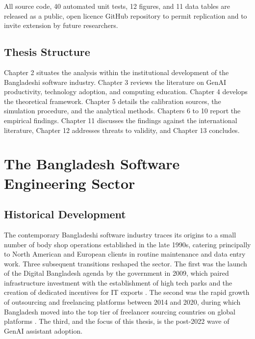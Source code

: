 \documentclass[11pt,a4paper]{report}
\begin{document}
All source code, 40 automated unit tests, 12 figures, and 11 data tables
are released as a public, open licence GitHub repository to permit
replication and to invite extension by future researchers.

\section{Thesis Structure}

\begin{sloppypar}
Chapter 2 situates the analysis within the institutional development of
the Bangladeshi software industry. Chapter 3 reviews the literature on
GenAI productivity, technology adoption, and computing education.
Chapter 4 develops the theoretical framework. Chapter 5 details the
calibration sources, the simulation procedure, and the analytical
methods. Chapters 6 to 10 report the empirical findings. Chapter 11
discusses the findings against the international literature, Chapter 12
addresses threats to validity, and Chapter 13 concludes.
\end{sloppypar}

\chapter{The Bangladesh Software Engineering Sector}

\section{Historical Development}

The contemporary Bangladeshi software industry traces its origins to a
small number of body shop operations established in the late 1990s,
catering principally to North American and European clients in routine
maintenance and data entry work. Three subsequent transitions reshaped
the sector. The first was the launch of the Digital Bangladesh agenda by
the government in 2009, which paired infrastructure investment with the
establishment of high tech parks and the creation of dedicated incentives
for IT exports \citep{LICTReport2023,WorldBank2024DigitalBD}. The second
was the rapid growth of outsourcing and freelancing platforms between
2014 and 2020, during which Bangladesh moved into the top tier of
freelancer sourcing countries on global platforms
\citep{KaramSiddiqueAlam2025}. The third, and the focus of this thesis,
is the post-2022 wave of GenAI assistant adoption.
\end{document}

